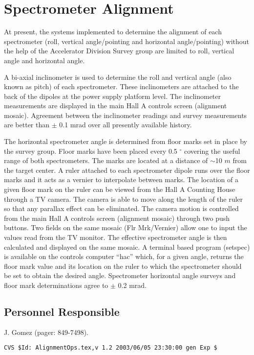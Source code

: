 \section{Spectrometer Alignment}

At present, the systems implemented to determine the alignment of each spectrometer
(roll, vertical angle/pointing and horizontal angle/pointing) without the help of the
Accelerator Division Survey group are limited to roll, vertical angle and horizontal angle.

A bi-axial inclinometer is used to determine the roll and vertical angle (also known as pitch)
of each spectrometer. These inclinometers are attached to the back of the dipoles at the power
supply platform level. The inclinometer measurements are displayed in the main Hall A controls
screen (alignment mosaic). Agreement between the inclinometer readings and survey measurements
are better than $\pm$ 0.1 mrad over all presently available history.

The horizontal spectrometer angle is determined from floor marks set in
place by the survey group. Floor marks have been placed every 0.5 $^\circ$ covering the useful range of
both spectrometers. The marks are located at a distance of $\sim$10 $m$ from the target center.
A ruler attached to each spectrometer dipole runs over the floor marks and it acts as a vernier to interpolate
between marks. The location of a given floor mark on the ruler can be viewed from the Hall A Counting
House through a TV camera. The camera is able to move along the length of the ruler so that any
parallax effect can be eliminated. The camera motion is controlled from the main Hall A controls screen
(alignment mosaic) through two push buttons. Two fields on the
same mosaic (Flr Mrk/Vernier) allow one to input
the values read from the TV monitor. The effective spectrometer angle is then calculated and displayed
on the same mosaic. A terminal based program (setspec) is available on the controls computer ``hac'' which, for
a given angle, returns the floor mark value and its location on the ruler to which the spectrometer should be set
to obtain the desired angle. Spectrometer horizontal angle surveys and floor mark determinations
agree to $\pm$ 0.2 mrad.

\subsection{Personnel Responsible}
J. Gomez (pager: 849-7498). 

%
%
{\small
\begin{verbatim}CVS $Id: AlignmentOps.tex,v 1.2 2003/06/05 23:30:00 gen Exp $\end{verbatim}
}
